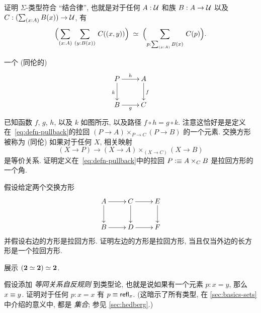 \begin{ex}
    \label{ex:sigma-assoc}
    证明 $\Sigma$-类型符合 ``结合律'',
    也就是对于任何 $A:\mathcal{U}$ 和族 $B:A\to\mathcal{U}$ 以及 $C:(\sm{x:A} B(x))\to\UU$, 有
    \[\eqvspaced{\Parens{\sm{x:A}{y:B(x)} C(\pairr{x,y})}}{\Parens{\sm{p:\sm{x:A}B(x)} C(p)}}. \]
\end{ex}

\begin{ex}
    \label{ex:pullback}
    一个 (同伦的) 
    \begin{equation*}
        \vcenter{\xymatrix{
            P\ar[r]^h\ar[d]_k &
            A\ar[d]^f\\
            B\ar[r]_g &
            C
        }}
    \end{equation*}
    已知函数 $f$, $g$, $h$, 以及 $k$ 如图所示, 以及路径 $f \circ h= g \circ k$.
    注意这恰好是是定义在~\eqref{eq:defn-pullback}的拉回 $(P\to A) \times_{P\to C} (P\to B)$ 的一个元素.
    交换方形被称为 (同伦) 
    如果对于任何 $X$, 相关映射
    \[ (X\to P) \to (X\to A) \times_{(X\to C)} (X\to B) \]
    是等价关系.
    证明定义在~\eqref{eq:defn-pullback}中的拉回 $P \vcentcolon\equiv A\times_C B$  是拉回方形的一个角.
\end{ex}

\begin{ex}
    \label{ex:pullback-pasting}
    假设给定两个交换方形
    \begin{equation*}
        \vcenter{\xymatrix{
            A\ar[r]\ar[d] &
            C\ar[r]\ar[d] &
            E\ar[d]\\
            B\ar[r] &
            D\ar[r] &
            F
        }}
    \end{equation*}
    并假设右边的方形是拉回方形.
    证明左边的方形是拉回方形, 当且仅当外边的长方形是一个拉回方形.
\end{ex}

\begin{ex}
    \label{ex:eqvboolbool}
    展示 $(\mathbf{2} \simeq \mathbf{2}) \simeq \mathbf{2}$.
\end{ex}

\begin{ex}
    \label{ex:equality-reflection}
    假设添加 \emph{等同关系自反规则} 到类型论, 也就是说如果有一个元素 $p:x=y$, 那么 $x\equiv y$.
    证明对于任何 $p:x=x$ 有 $p\equiv \mathsf{refl}_{x}$.
    (这暗示了所有类型, 在 \cref{sec:basics-sets} 中介绍的意义中, 都是 \emph{集合}; 参见 \cref{sec:hedberg}.)
\end{ex}

